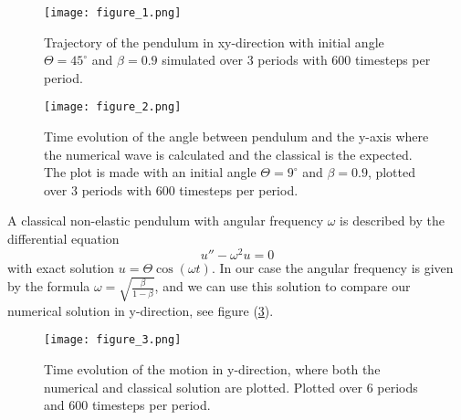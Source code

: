 \documentclass[norsk,a4paper,12pt]{article}
\begin{document}
\begin{figure}[!htbp]
\centering
\texttt{[image: figure\_1.png]}
\caption{Trajectory of the pendulum in xy-direction with initial angle $\Theta=45^{\circ}$ and $\beta=0.9$ simulated over 3 periods with 600 timesteps per period. \label{pen_tra}}
\end{figure}
\begin{figure}[!htbp]
\centering
\texttt{[image: figure\_2.png]}
\caption{Time evolution of the angle between pendulum and the y-axis where the numerical wave is calculated and the classical is the expected. The plot is made with an initial angle $\Theta=9^{\circ}$ and $\beta=0.9$, plotted over 3 periods with 600 timesteps per period.  \label{ang_time}}
\end{figure}

A classical non-elastic pendulum with angular frequency $\omega$ is described by the differential equation \begin{equation}
u''-\omega^2u=0
\end{equation}
with exact solution $u=\Theta\cos(\omega t)$. In our case the angular frequency is given by the formula $\omega=\sqrt{\frac{\beta}{1-\beta}}$, and we can use this solution to compare our numerical solution in y-direction, see figure (\ref{y_time}).
\begin{figure}[!htbp]
\centering
\texttt{[image: figure\_3.png]}
\caption{Time evolution of the motion in y-direction, where both the numerical and classical solution are plotted. Plotted over 6 periods and 600 timesteps per period. \label{y_time}}
\end{figure}
\end{document}

